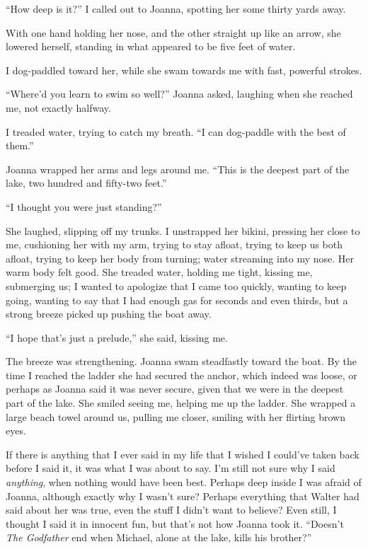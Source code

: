 ``How deep is it?'' I called out to Joanna, spotting her some thirty
yards away.

With one hand holding her nose, and the other straight up like an arrow,
she lowered herself, standing in what appeared to be five feet of water.

I dog-paddled toward her, while she swam towards me with fast, powerful
strokes.

``Where'd you learn to swim so well?'' Joanna asked, laughing when she
reached me, not exactly halfway.

I treaded water, trying to catch my breath. ``I can dog-paddle with the
best of them.''

Joanna wrapped her arms and legs around me. ``This is the deepest part
of the lake, two hundred and fifty-two feet.''

``I thought you were just standing?''

She laughed, slipping off my trunks. I unstrapped her bikini, pressing
her close to me, cushioning her with my arm, trying to stay afloat,
trying to keep us both afloat, trying to keep her body from turning;
water streaming into my nose. Her warm body felt good. She treaded
water, holding me tight, kissing me, submerging us; I wanted to
apologize that I came too quickly, wanting to keep going, wanting to say
that I had enough gas for seconds and even thirds, but a strong breeze
picked up pushing the boat away.

``I hope that's just a prelude,'' she said, kissing me.

The breeze was strengthening. Joanna swam steadfastly toward the boat.
By the time I reached the ladder she had secured the anchor, which
indeed was loose, or perhaps as Joanna said it was never secure, given
that we were in the deepest part of the lake. She smiled seeing me,
helping me up the ladder. She wrapped a large beach towel around us,
pulling me closer, smiling with her flirting brown eyes.

If there is anything that I ever said in my life that I wished I
could've taken back before I said it, it was what I was about to say.
I'm still not sure why I said \emph{anything}, when nothing would have
been best. Perhaps deep inside I was afraid of Joanna, although exactly
why I wasn't sure? Perhaps everything that Walter had said about her was
true, even the stuff I didn't want to believe? Even still, I thought I
said it in innocent fun, but that's not how Joanna took it. ``Doesn't
\emph{The Godfather} end when Michael, alone at the lake, kills his
brother?''

